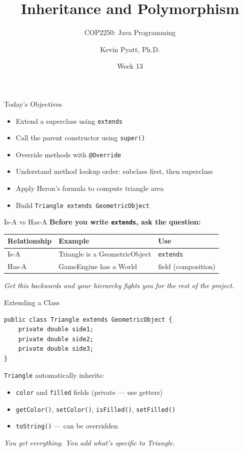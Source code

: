 \documentclass{beamer}
\title[Inheritance]{Inheritance and Polymorphism}
\subtitle{COP2250: Java Programming}
\author{Kevin Pyatt, Ph.D.}
\institute{State College of Florida \\ Pyatt Labs}
\date{Week 13}
\begin{document}
\begin{frame}
  \titlepage
\end{frame}
\begin{frame}{Today's Objectives}
\begin{itemize}
  \item Extend a superclass using \texttt{extends}
  \item Call the parent constructor using \texttt{super()}
  \item Override methods with \texttt{@Override}
  \item Understand method lookup order: subclass first, then superclass
  \item Apply Heron's formula to compute triangle area
  \item Build \texttt{Triangle extends GeometricObject}
\end{itemize}
\end{frame}
\begin{frame}{Is-A vs Has-A}
\textbf{Before you write \texttt{extends}, ask the question:}
\vspace{0.3cm}
\begin{tabular}{lll}
\toprule
\textbf{Relationship} & \textbf{Example} & \textbf{Use} \\
\midrule
Is-A & Triangle is a GeometricObject & \texttt{extends} \\
Has-A & GameEngine has a World & field (composition) \\
\bottomrule
\end{tabular}
\vspace{0.3cm}
\textit{Get this backwards and your hierarchy fights you for the rest of the project.}
\end{frame}
\begin{frame}[fragile]{Extending a Class}
\begin{lstlisting}
public class Triangle extends GeometricObject {
    private double side1;
    private double side2;
    private double side3;
}
\end{lstlisting}
\vspace{0.3cm}
\texttt{Triangle} automatically inherits:
\begin{itemize}
  \item \texttt{color} and \texttt{filled} fields (private --- use getters)
  \item \texttt{getColor()}, \texttt{setColor()}, \texttt{isFilled()}, \texttt{setFilled()}
  \item \texttt{toString()} --- can be overridden
\end{itemize}
\vspace{0.2cm}
\textit{You get everything. You add what's specific to Triangle.}
\end{frame}
\end{document}
